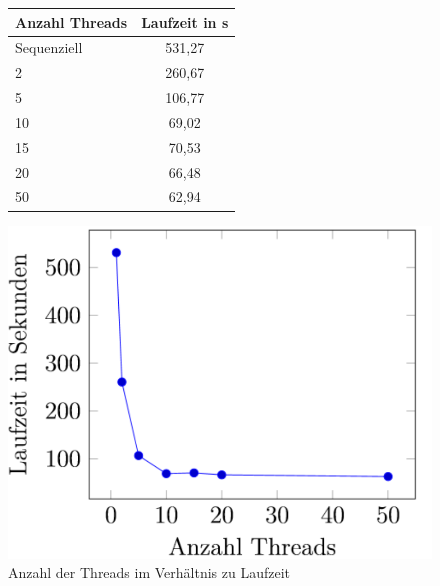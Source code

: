 \begin{figure}[!hbt]
	\begin{minipage}[!hbt]{5cm}
		\centering
		
		\begin{tabular}{l|c}
			\toprule
			\textbf{Anzahl Threads} & \textbf{Laufzeit in s} \\
			\midrule
			Sequenziell & 531,27 \\
			2 & 260,67 \\
			5 & 106,77 \\
			10 & 69,02 \\
			15 & 70,53 \\
			20 & 66,48 \\
			50 & 62,94 \\
			\bottomrule
		\end{tabular}
		
	\end{minipage}
	\hfill
	\begin{minipage}[!hbt]{8.2cm}
		\centering
	
		
			\includegraphics[scale=0.6]{images/laufzeiten}			 
		
	\end{minipage}
	\caption{Anzahl der Threads im Verhältnis zu Laufzeit}\label{fig.laufzeitListe}
\end{figure}

\listoffigures
\lstlistoflistings
\listoftables


